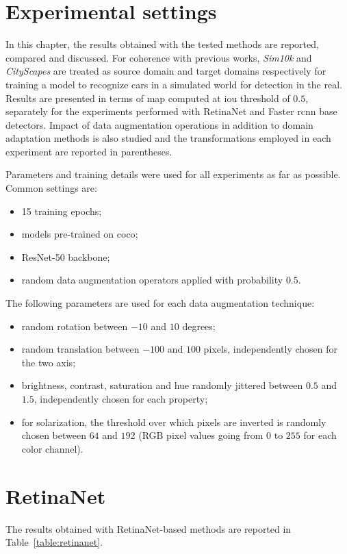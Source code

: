 \documentclass[%
    corpo=12pt,
    twoside,
    stile=classica,   
    tipotesi=magistrale,
    evenboxes,
    english
]{toptesi}
\begin{document}
\section{Experimental settings}
In this chapter, the results obtained with the tested methods are reported, compared and discussed. For coherence with previous works, \textit{Sim10k} and \textit{CityScapes} are treated as source domain and target domains respectively for training a model to recognize cars in a simulated world for detection in the real. Results are presented in terms of \gls{map} computed at \gls{iou} threshold of $ 0.5 $, separately for the experiments performed with RetinaNet and Faster \gls{rcnn} base detectors. Impact of data augmentation operations in addition to domain adaptation methods is also studied and the transformations employed in each experiment are reported in parentheses.

Parameters and training details were used for all experiments as far as possible. Common settings are:
\begin{itemize}
	\item 15 training epochs;
	\item models pre-trained on \gls{coco};
	\item ResNet-50 backbone;
	\item random data augmentation operators applied with probability $ 0.5 $.
\end{itemize}
The following parameters are used for each data augmentation technique:
\begin{itemize}
	\item random rotation between $ -10 $ and $ 10 $ degrees;
	\item random translation between $ -100 $ and $ 100 $ pixels, independently chosen for the two axis;
	\item brightness, contrast, saturation and hue randomly jittered between $ 0.5 $ and $ 1.5 $, independently chosen for each property;
	\item for solarization, the threshold over which pixels are inverted is randomly chosen between $ 64 $ and $ 192 $ (RGB pixel values going from $ 0 $ to $ 255 $ for each color channel).
\end{itemize}

\section{RetinaNet}
The results obtained with RetinaNet-based methods are reported in Table~\ref{table:retinanet}.
\end{document}
